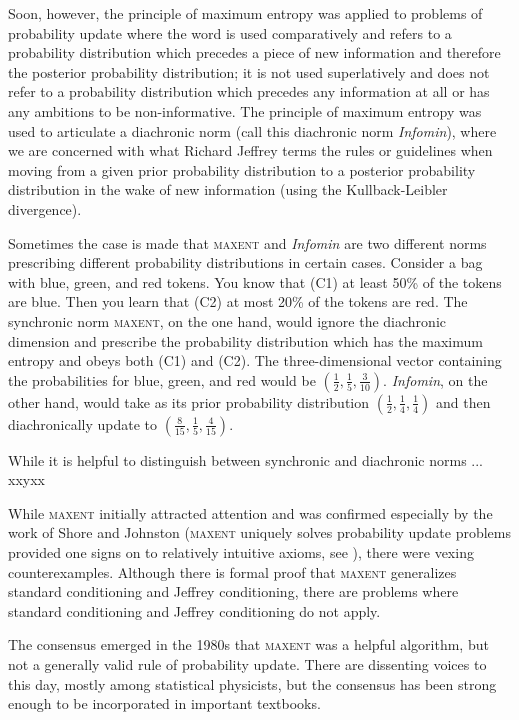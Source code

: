 \documentclass[11pt]{article}
\begin{document}
Soon, however, the principle of maximum entropy was applied to
problems of probability update where the word  is used
comparatively and refers to a probability distribution which precedes
a piece of new information and therefore the posterior probability
distribution; it is not used superlatively and does not refer to a
probability distribution which precedes any information at all or has
any ambitions to be non-informative. The principle of maximum entropy
was used to articulate a diachronic norm (call this diachronic norm
\emph{Infomin}), where we are concerned with what Richard Jeffrey
terms  the rules or guidelines when
moving from a given prior probability distribution to a posterior
probability distribution in the wake of new information (using the
Kullback-Leibler divergence).

Sometimes the case is made that \textsc{maxent} and \emph{Infomin} are
two different norms prescribing different probability distributions in
certain cases. Consider a bag with blue, green, and red tokens. You
know that (C1) at least 50\% of the tokens are blue. Then you learn
that (C2) at most 20\% of the tokens are red. The synchronic norm
\textsc{maxent}, on the one hand, would ignore the diachronic
dimension and prescribe the probability distribution which has the
maximum entropy and obeys both (C1) and (C2). The three-dimensional
vector containing the probabilities for blue, green, and red would be
$(\frac{1}{2},\frac{1}{5},\frac{3}{10})$. \emph{Infomin}, on the other
hand, would take as its prior probability distribution
$(\frac{1}{2},\frac{1}{4},\frac{1}{4})$ and then diachronically update
to $(\frac{8}{15},\frac{1}{5},\frac{4}{15})$. 

While it is helpful to distinguish between synchronic and diachronic
norms ... xxyxx

While \textsc{maxent} initially attracted attention and was confirmed
especially by the work of Shore and Johnston (\textsc{maxent} uniquely
solves probability update problems provided one signs on to relatively
intuitive axioms, see ), there were vexing
counterexamples. Although there is formal proof that \textsc{maxent}
generalizes standard conditioning and Jeffrey conditioning, there are
problems where standard conditioning and Jeffrey conditioning do not
apply.

The consensus emerged in the 1980s that \textsc{maxent} was a helpful
algorithm, but not a generally valid rule of probability update. There
are dissenting voices to this day, mostly among statistical
physicists, but the consensus has been strong enough to be
incorporated in important textbooks.
\end{document}
